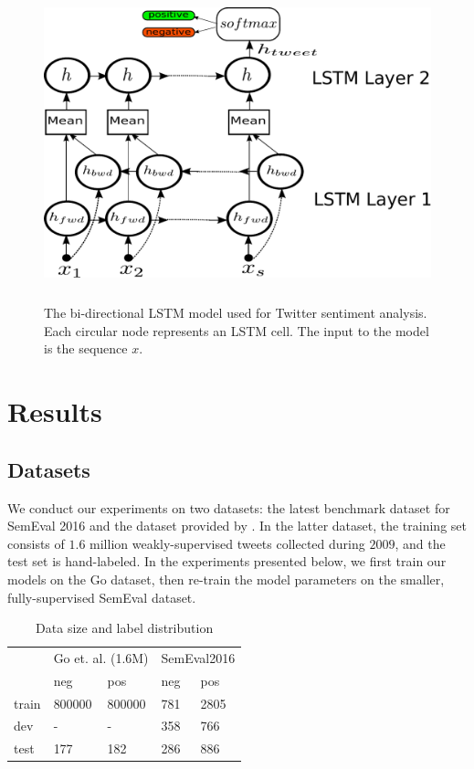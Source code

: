 \documentclass{article} %
\begin{document}
\begin{figure}[t]
	\centering
	\includegraphics[width=\textwidth, height=3.6in]{figs/mylstm.pdf}
	\caption{The bi-directional LSTM model used for Twitter sentiment analysis. Each circular node represents an LSTM cell. The input to the model is the sequence $x$. }
	\label{fig:mylstm}
\end{figure}


\section{Results}

\subsection{Datasets}
We conduct our experiments on two datasets: the latest benchmark dataset for SemEval 2016 and the dataset provided by \cite{go2009twitter}. In the latter dataset, the training set consists of $1.6$ million weakly-supervised tweets collected during $2009$, and the test set is hand-labeled. In the experiments presented below, we first train our models on the Go dataset, then re-train the model parameters on the smaller, fully-supervised SemEval dataset.

\begin{table}[h!]
\centering
\caption{Data size and label distribution}
\begin{tabular}{|lllll|}
\hline
      & \multicolumn{2}{l}{Go et. al. (1.6M)} & \multicolumn{2}{l}{SemEval2016} \\
      & neg               & pos               & neg            & pos            \\
\hline
train & 800000            & 800000            & 781            & 2805           \\
dev   & -                 & -                 & 358            & 766            \\
test  & 177               & 182               & 286            & 886           \\
\hline
\end{tabular}
\label{table:corpus}
\end{table}
\end{document}
